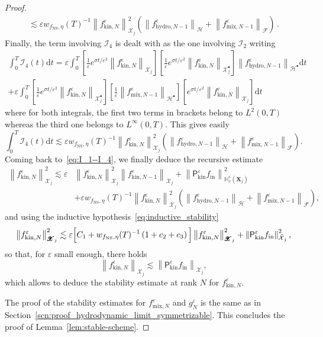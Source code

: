 \documentclass[10pt]{amsart}
\theoremstyle{definition}\newtheorem{defi}[theo]{Definition}\newtheorem{rema}[theo]{Remark}\newtheorem{exam}[theo]{Example}\newtheorem{exem}[theo]{Example}\newtheorem{nota}[theo]{Notation}
\newcommand{\ini}{\mathrm{in}}
\newcommand{\ns}{\mathrm{NS}}
\newcommand{\hyd}{\mathrm{hydro}}
\newcommand{\mix}{\mathrm{mix}}
\newcommand{\kin}{\mathrm{kin}}
\renewcommand{\d}{\mathrm{d}}
\newcommand{\bbH}{\mathbb{H}}
\newcommand{\XX}{\mathcal{X}}
\newcommand{\HH}{\mathcal{H}}
\newcommand{\PP}{\mathsf{P}}
\newcommand{\FFF}{\mathscr{F}}
\newcommand{\HHH}{\mathscr{H}}
\newcommand{\GGG}{\mathscr{X}}
\newcommand{\scI}{\mathscr{I}}
\newcommand{\SSsp}{\HH^{\bullet}}
\newcommand{\SSSs}{\HHH}
\newcommand{\SSl}{\XX}
\newcommand{\Sh}{\bm{X}}
\newcommand{\SSh}{\bm{\XX}}
\newcommand{\SShp}{\bm{\XX}^{\bullet}}
\newcommand{\SSSh}{\pmb{\GGG}}
\newcommand{\SSSm}{\FFF}
\newcommand*\eps{{\varepsilon}}
\let\oldtilde\tilde
\renewcommand*{\tilde}[1]{\mathchoice{\widetilde{#1}}{\widetilde{#1}}{\oldtilde{#1}}{\oldtilde{#1}}}
\begin{document}
\begin{proof}
\begin{multline*}
\lesssim \eps w_{ f_\ns, \eta }(T)^{-1} \left\| f^\eps_{\kin, N} \right\|^2_{\SSSh_j} \left(\left\| f^\eps_{\hyd, N-1}\right\|_{\SSSs} + \left\| f^\eps_{\mix, N-1}\right\|_{\SSSm} \right)\,.
\end{multline*}
Finally, the term involving $\scI_4$ is dealt with as the one involving $\scI_2$ writing
\begin{multline*}
\int_0^T \scI_4(t)\d t = \eps \int_0^T \left[\frac{1}{\eps} e^{\sigma t / \eps^2} \left\| f^\eps_{\kin, N} \right\|_{\SSh_j} \right] \left[\frac{1}{\eps} e^{\sigma t / \eps^2} \left\| f^\eps_{\kin, N} \right\|_{\SShp_{j}} \right] \left\| f^\eps_{\hyd, N-1} \right\|_{\SSsp} \d t \\
+ \eps \int_0^T \left[\frac{1}{\eps} e^{\sigma t / \eps^2} \left\| f^\eps_{\kin, N} \right\|_{\SShp_{j}} \right] \left[\frac{1}{\eps} \left\| f^\eps_{\mix, N-1} \right\|_{\SSsp} \right] \left[e^{\sigma t / \eps^2} \left\| f^\eps_{\kin, N}\right\|_{\SSh_j} \right]\d t
\end{multline*}
where for both integrals, the first two terms in brackets belong to $L^2(0,T)$ whereas the third one belongs to $L^\infty(0,T)$. This gives easily
\[
\int_0^T \scI_4(t)\d t \lesssim \eps w_{ f_\ns, \eta }(T)^{-1} \left\| f^\eps_{\kin, N} \right\|^2_{\SSSh_j} \left(\left\| f^\eps_{\hyd, N-1} \right\|_{\SSSs} + \left\| f^\eps_{\mix, N-1}\right\|_{\SSSm} \right).
\]
Coming back to~\eqref{eq:I_1--I_4}, we finally deduce the recursive estimate
\begin{align*}
\left\| f^\eps_{\kin, N} \right\|^2_{\SSSh_j} \lesssim \eps & \left\| f^\eps_{\kin, N} \right\|^2_{ \SSSh_j} \left\| f^\eps_{\kin, N-1} \right\|_{ \SSSh_j} + \left\| \PP^\eps_\kin f_\ini \right\|^2_{\bbH^s_x(\Sh_j)}\\
&+ \eps w_{ f_\ns, \eta }(T)^{-1} \left\| f^\eps_{\kin, N} \right\|^2_{\SSSh_j} \left(\left\| f^\eps_{\hyd, N-1} \right\|_{\SSSs} + \left\| f^\eps_{\mix, N-1} \right\|_{\SSSm} \right),
\end{align*}
and using the inductive hypothesis~\eqref{eq:inductive_stability}
\begin{equation*}
\left\| f^\eps_{\kin, N} \right\|^2_{\SSSh_j} \lesssim \eps \Big[C_1 + w_{ f_\ns, \eta }(T)^{-1} \left(1 + c_2 + c_3 \right) \Big]\left\| f^\eps_{\kin, N} \right\|^2_{ \SSSh_j} + \left\| \PP^\eps_\kin f_\ini \right\|^2_{\tilde{\SSl}_j},
\end{equation*}
so that, for $\eps$ small enough, there holds
\[
\left\| f^\eps_{\kin, N} \right\|_{\SSSh_j} \lesssim \left\| \PP^\eps_\kin f_\ini \right\|_{\SSSh_j},
\]
which allows to deduce the stability estimate at rank $N$ for $f^\eps_{\kin, N}$.

The proof of the stability estimates for $f^\eps_{\mix, N}$ and $g^\eps_N$ is the same as in Section~\ref{scn:proof_hydrodynamic_limit_symmetrizable}. This concludes the proof of Lemma~\ref{lem:stable-scheme}.
\end{proof}
\end{document}

